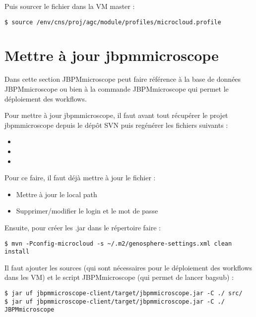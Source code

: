 Puis sourcer le fichier  dans la VM master :
\begin{lstlisting}[style=bash]
$ source /env/cns/proj/agc/module/profiles/microcloud.profile
\end{lstlisting}

\section{Mettre à jour jbpmmicroscope}

Dans cette section JBPMmicroscope peut faire référence à la base de données JBPMmicroscope ou bien à la commande JBPMmicroscope qui permet le déploiement des workflows.
\newline

Pour mettre à jour jbpmmicroscope, il faut avant tout récupérer le projet jbpmmicroscope depuis le dépôt SVN puis regénérer les fichiers suivants :
\begin{itemize}
	\item {}
	\item {}
	\item {}
\end{itemize}
\bigskip

Pour ce faire, il faut déjà mettre à jour le fichier  :
\begin{itemize}
	\item Mettre à jour le local path
	\item Supprimer/modifier le login et le mot de passe
\end{itemize}
\bigskip

Ensuite, pour créer les .jar dans le répertoire  faire :

\begin{lstlisting}[style=bash]
$ mvn -Pconfig-microcloud -s ~/.m2/genosphere-settings.xml clean install
\end{lstlisting}
\bigskip

Il faut ajouter les sources (qui sont nécessaires pour le déploiement des workflows dans les VM) et le script JBPMmicroscope (qui permet de lancer bagsub) :
\begin{lstlisting}[style=bash]
$ jar uf jbpmmicroscope-client/target/jbpmmicroscope.jar -C ./ src/
$ jar uf jbpmmicroscope-client/target/jbpmmicroscope.jar -C ./ JBPMmicroscope
\end{lstlisting}
\bigskip

